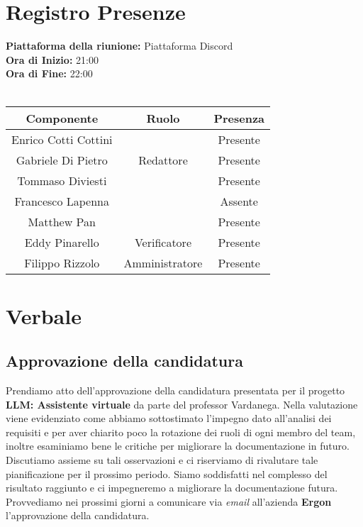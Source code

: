 \documentclass{article}
\begin{document}
\newpage
\tableofcontents

\newpage
\section{Registro Presenze}
\textbf{Piattaforma della riunione:} Piattaforma Discord \\
\textbf{Ora di Inizio:} 21:00\\
\textbf{Ora di Fine:} 22:00\\
\\
\begin{tabular}{|c|c|c|} %
    \hline
    \textbf{Componente} & \textbf{Ruolo} & \textbf{Presenza}\\
    \hline
    Enrico Cotti Cottini &  & Presente \\ 
    \hline
    Gabriele Di Pietro & Redattore & Presente\\ 
    \hline
    Tommaso Diviesti &  & Presente \\ 
    \hline 
    Francesco Lapenna & & Assente \\ 
    \hline
    Matthew Pan &  & Presente\\ 
    \hline 
    Eddy Pinarello & Verificatore & Presente \\ 
    \hline 
    Filippo Rizzolo & Amministratore & Presente \\ 
    \hline 
\end{tabular}

\newpage
\section{Verbale}
\subsection{Approvazione della candidatura}
Prendiamo atto dell'approvazione della candidatura presentata per il progetto \textbf{LLM: Assistente virtuale} da parte del professor Vardanega.
Nella valutazione viene evidenziato come abbiamo sottostimato l'impegno dato all'analisi dei requisiti e per aver chiarito poco la rotazione dei ruoli di ogni membro del team, inoltre esaminiamo bene le critiche per migliorare la documentazione in futuro.
Discutiamo assieme su tali osservazioni e ci riserviamo di rivalutare tale pianificazione per il prossimo periodo.
Siamo soddisfatti nel complesso del risultato raggiunto e ci impegneremo a migliorare la documentazione futura.
Provvediamo nei prossimi giorni a comunicare via \textit{email} all'azienda \textbf{Ergon} l'approvazione della candidatura.
\end{document}
